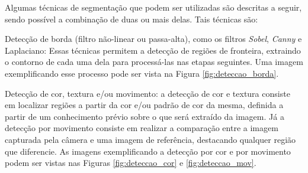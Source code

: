 \documentclass[12pt,oneside,a4paper,chapter=TITLE,section=TITLE,sumario
		=tradicional]{abntex2}
\begin{document}
		Algumas técnicas de segmentação que podem ser utilizadas são descritas a seguir, sendo possível a combinação de duas ou mais delas. Tais técnicas são:
		
		\begin{lista}
			\item Detecção de borda (filtro não-linear ou passa-alta), como os filtros \textit{Sobel}, \textit{Canny} e Laplaciano: Essas técnicas permitem a detecção de regiões de fronteira, extraindo o contorno de cada uma dela para processá-las nas etapas seguintes. Uma imagem exemplificando esse processo pode ser vista na Figura \ref{fig:deteccao_borda}.
						
			\begin{figure}[H]
			\end{figure}			
			
			\item Detecção de cor, textura e/ou movimento: a detecção de cor e textura consiste em localizar regiões a partir da cor e/ou padrão de cor da mesma, definida a partir de um conhecimento prévio sobre o que será extraído da imagem. Já a detecção por movimento consiste em realizar a comparação entre a imagem capturada pela câmera e uma imagem de referência, destacando qualquer região que diferencie. As imagens exemplificando a detecção por cor e por movimento podem ser vistas nas Figuras \ref{fig:deteccao_cor} e \ref{fig:deteccao_mov}. 
			
			\begin{figure}[H]
				\hspace{2cm}
				 \\
					
			\end{figure}
		
			\begin{figure}[H]
				\hspace{2cm}
				 \\
				\hspace{2cm}
			\end{figure}		
			

\end{lista}
\end{document}
